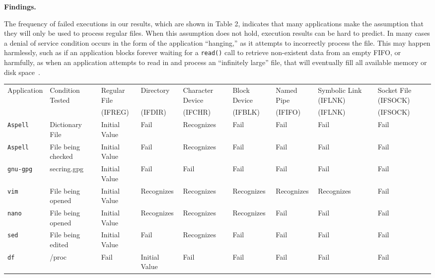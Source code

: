 {\bf Findings.}

The frequency of failed executions in our results,
which are shown in Table 2,
indicates that many
applications make the assumption that they will only be used to process
regular files.  When this assumption does not hold, execution results
can be hard to predict.
In many cases a denial of
service condition occurs in the form of the application ``hanging,'' as it
attempts to incorrectly process the file.
This may happen harmlessly, such
as if an application blocks forever waiting for a {\tt read()}
call to retrieve non-existent data from an empty FIFO,
or harmfully,
as when an application attempts to read in and process an
``infinitely large'' file,
that will eventually fill all
available memory or disk space~\cite{Cappos_CCS_08}.


\begin{table}[t]
    \scriptsize{}
    \begin{tabular}{l  l  |  l  l  l  l  l  l  l}
    \toprule{}
        Application & Condition Tested           & Regular File & Directory & Character Device & Block Device & Named Pipe & Symbolic Link (IFLNK)    & Socket File (IFSOCK)\\
                    &                            &  (IFREG)     & (IFDIR)   & (IFCHR)          & (IFBLK)      & (IFIFO)    & (IFLNK)                  & (IFSOCK)\\
\hline
        {\tt Aspell}      & Dictionary File            & Initial Value  & Fail           & Recognizes  & Fail       & Fail        & Fail       & Fail\\
        {\tt Aspell}      & File being checked         & Initial Value  & Fail           & Recognizes  & Fail       & Fail        & Fail       & Fail\\
        {\tt gnu-gpg}     & secring.gpg                & Initial Value  & Fail           & Fail        & Fail       & Fail        & Fail       & Fail\\
        {\tt vim}         & File being opened          & Initial Value  & Recognizes     & Recognizes  & Recognizes & Recognizes & Recognizes & Fail\\
        {\tt nano}        & File being opened          & Initial Value  & Recognizes     & Recognizes  & Recognizes & Fail        & Fail       & Fail\\
        {\tt sed}         & File being edited          & Initial Value  & Fail           & Recognizes  & Fail       & Fail        & Fail       & Fail\\
        {\tt df}          & /proc                      & Fail           & Initial Value  & Fail        & Fail       & Fail        & Fail       & Fail\\

\end{tabular}
\end{table}

